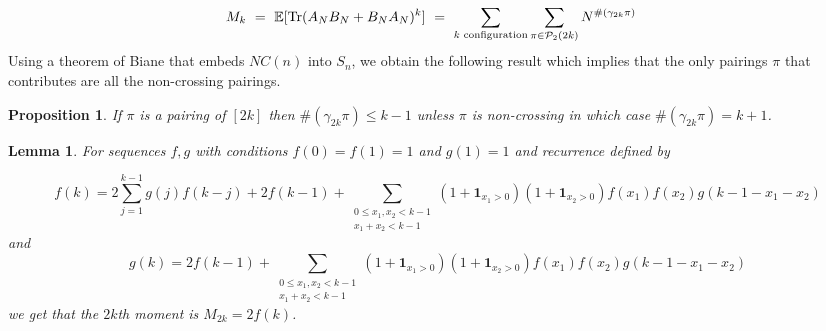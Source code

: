 \documentclass[12pt,reqno]{amsart}
\theoremstyle{plain} %
\newtheorem{prop}[theorem]{Proposition}
\newtheorem{lemma}[theorem]{Lemma}
\theoremstyle{remark}
\theoremstyle{definition}
\begin{document}
\begin{align*}
M_k \ = \ \mathbb{E}[\textup{Tr}(A_NB_N+B_NA_N)^k] &\ = \ \sum_{k\textup{ configuration}}\sum_{\pi\in \mathcal{P}_2(2k)}N^{\#(\gamma_{2k}\pi)}
\end{align*}
Using a theorem of Biane that embeds $NC(n)$ into $S_n$, we obtain the following result which implies that the only pairings $\pi$ that contributes are all the non-crossing pairings.
\begin{prop}
If $\pi$ is a pairing of $[2k]$ then $\#(\gamma_{2k}\pi)\leq k-1$ unless $\pi$ is non-crossing in which case $\#(\gamma_{2k}\pi)=k+1$.
\end{prop}

\begin{lemma} For sequences $f,g$ with conditions $f(0)=f(1)=1$ and $g(1)=1$ and recurrence defined by

\[
f(k)=2\sum_{j=1}^{k-1}g(j)f(k-j) + 2f(k-1) + \sum_{\substack{0\leq x_1,x_2<k-1\\ x_1+x_2<k-1}}(1+\mathbf{1}_{x_1>0})(1+\mathbf{1}_{x_2>0})f(x_1)f(x_2)g(k-1-x_1-x_2)
\]
and 
\[
g(k)=2f(k-1) + \sum_{\substack{0\leq x_1,x_2<k-1\\ x_1+x_2<k-1}}(1+\mathbf{1}_{x_1>0})(1+\mathbf{1}_{x_2>0})f(x_1)f(x_2)g(k-1-x_1-x_2)
\]
we get that the $2k$th moment is $M_{2k}=2f(k)$.
\end{lemma}
\end{document}
